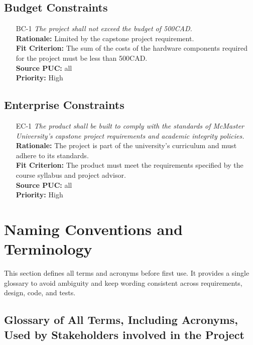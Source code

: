 \documentclass[12pt]{article}
\begin{document}
\subsection{Budget Constraints}

\begin{itemize}[leftmargin=*]
  \item[BC-1] \emph{The project shall not exceed the budget of 500CAD.}\\[2mm]
        \textbf{Rationale:} Limited by the capstone project requirement.\\
        \textbf{Fit Criterion:} The sum of the costs of the hardware components required for the project must be less than 500CAD.\\
        \textbf{Source PUC:} all\\
        \textbf{Priority:} High
\end{itemize}

\subsection{Enterprise Constraints}

\begin{itemize}[leftmargin=*]
  \item[EC-1] \emph{The product shall be built to comply with the standards of McMaster
          University's capstone project requirements and academic integrity policies.}\\[2mm]
        \textbf{Rationale:} The project is part of the university's curriculum and must adhere to its standards.\\
        \textbf{Fit Criterion:} The product must meet the requirements specified by the course syllabus and project advisor.\\
        \textbf{Source PUC:} all\\
        \textbf{Priority:} High
\end{itemize}

\section{Naming Conventions and Terminology}
This section defines all terms and acronyms before first use.
It provides a single glossary to avoid ambiguity and keep wording consistent across requirements, design, code, and tests.
\subsection{Glossary of All Terms, Including Acronyms, Used by Stakeholders
  involved in the Project}
\end{document}
